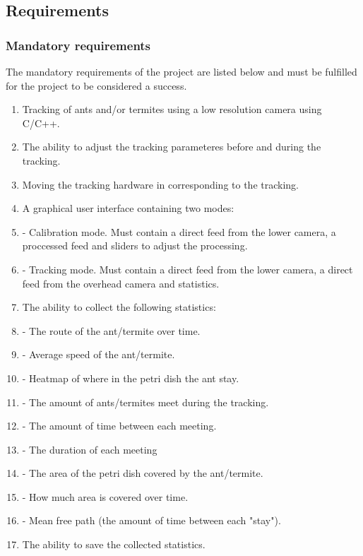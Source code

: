 \subsection{Requirements}

\subsubsection{Mandatory requirements}
The mandatory requirements of the project are listed below and must be fulfilled for the project to be considered a success.

\begin{enumerate}
    \item Tracking of ants and/or termites using a low resolution camera using C/C++.
    \item The ability to adjust the tracking parameteres before and during the tracking.
    \item Moving the tracking hardware in corresponding to the tracking.
	\item A graphical user interface containing two modes:
    \item - Calibration mode. Must contain a direct feed from the lower camera, a proccessed feed and sliders to adjust the processing.
    \item - Tracking mode. Must contain a direct feed from the lower camera, a direct feed from the overhead camera and statistics.
    \item The ability to collect the following statistics:
    \item - The route of the ant/termite over time. 
    \item - Average speed of the ant/termite.
    \item - Heatmap of where in the petri dish the ant stay.
    \item - The amount of ants/termites meet during the tracking.
    \item - The amount of time between each meeting.
    \item - The duration of each meeting
    \item - The area of the petri dish covered by the ant/termite.
    \item - How much area is covered over time.
    \item - Mean free path (the amount of time between each "stay").
    \item The ability to save the collected statistics.
\end{enumerate}

